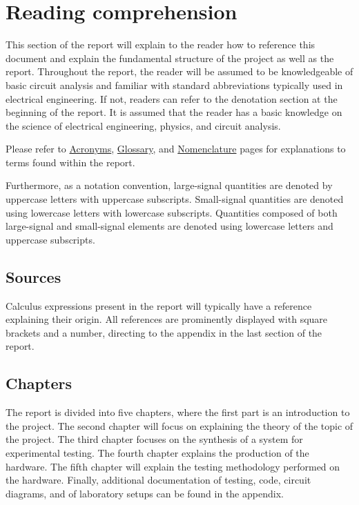 \chapter*{Reading comprehension} \label{cha:report_structure}
This section of the report will explain to the reader how to reference this document and explain the fundamental structure of the project as well as the report. Throughout the report, the reader will be assumed to be knowledgeable of basic circuit analysis and familiar with standard abbreviations typically used in electrical engineering. If not, readers can refer to the denotation section at the beginning of the report. It is assumed that the reader has a basic knowledge on the science of electrical engineering, physics, and circuit analysis.

Please refer to \hyperref[cha:acronyms]{Acronyms}, \hyperref[cha:glossary]{Glossary}, and \hyperref[cha:nomenclature]{Nomenclature} pages for explanations to terms found within the report.

Furthermore, as a notation convention, large-signal  quantities are denoted by uppercase letters with uppercase subscripts. Small-signal quantities are denoted using lowercase letters with lowercase subscripts. Quantities composed of both large-signal and small-signal elements are denoted using lowercase letters and uppercase subscripts.

\section*{Sources}
Calculus expressions present in the report will typically have a reference explaining their origin. All references are prominently displayed with square brackets and a number, directing to the appendix in the last section of the report.

\section*{Chapters}
The report is divided into five chapters, where the first part is an introduction to the project. The second chapter will focus on explaining the theory of the topic of the project. The third chapter focuses on the synthesis of a system for experimental testing. The fourth chapter explains the production of the hardware. The fifth chapter will explain the testing methodology performed on the hardware. Finally, additional documentation of testing, code, circuit diagrams, and of laboratory setups can be found in the appendix.